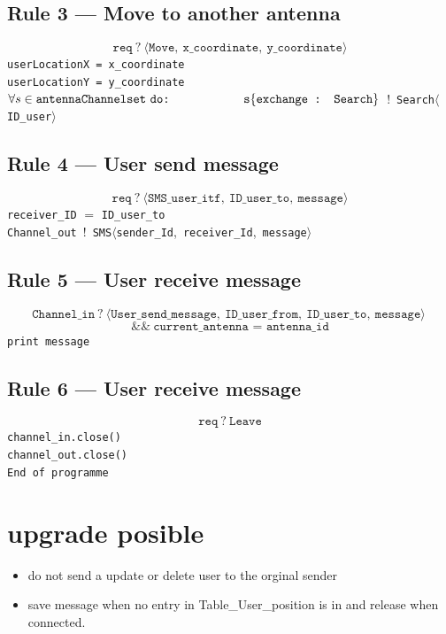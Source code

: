 \documentclass[a4paper,11pt]{article}
\begin{document}
\subsection*{Rule 3 — Move to another antenna}

\[
\texttt{req}\ ?\ \langle\texttt{Move},\ \texttt{x\_coordinate},\ \texttt{y\_coordinate}\rangle
\]
\hspace*{3em}\texttt{userLocationX = x\_coordinate}\\
\hspace*{3em}\texttt{userLocationY = y\_coordinate}\\
\hspace*{3em}$\forall s \in \texttt{antennaChannelset}\ \texttt{do:}\\
\hspace*{6em}\texttt{s}\{\texttt{exchange : Search}\}$\ !\ \texttt{Search}$\langle$\texttt{ID\_user}$\rangle$

\subsection*{Rule 4 — User send message}

\[
\texttt{req}\ ?\ \langle\texttt{SMS\_user\_itf},\ \texttt{ID\_user\_to},\ \texttt{message}\rangle
\]
\hspace*{3em}\texttt{receiver\_ID} $=$ \texttt{ID\_user\_to}\\
\hspace*{3em}\texttt{Channel\_out}\ !\ \texttt{SMS}$\langle$\texttt{sender\_Id},\ \texttt{receiver\_Id},\ \texttt{message}$\rangle$


\subsection*{Rule 5 — User receive message}

\[
\texttt{Channel\_in}\ ?\ \langle\texttt{User\_send\_message},\ \texttt{ID\_user\_from},\ \texttt{ID\_user\_to},\ \texttt{message}\rangle\ 
\]
\[
\&\&\ \texttt{current\_antenna = antenna\_id} 
\]
\hspace*{3em}\texttt{print message}

\subsection*{Rule 6 — User receive message}

\[
\texttt{req}\ ?\ \texttt{Leave}
\]
\hspace*{3em}\texttt{channel\_in.close()}\\
\hspace*{3em}\texttt{channel\_out.close()}\\
\hspace*{3em}\texttt{End of programme}


\section*{upgrade posible}
\begin{itemize}
    \item do not send a update or delete user to the orginal sender
    \item save message when no entry in Table\_User\_position is in and release when connected.
\end{itemize}
\end{document}
